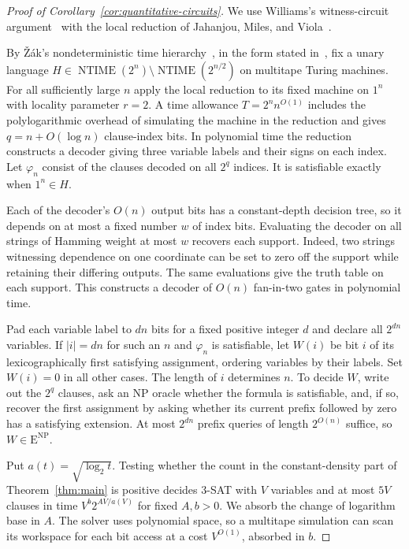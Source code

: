 \begin{proof}[Proof of Corollary~\ref{cor:quantitative-circuits}]
We use Williams's witness-circuit argument~\cite[Theorem~6.1]{Wil13}
with the local reduction of Jahanjou, Miles, and
Viola~\cite[Theorem~1 and Section~6]{JMV13}.

By \v{Z}\'ak's nondeterministic time hierarchy~\cite{Zak83}, in the
form stated in~\cite[Theorem~2.1 in the full version]{Wil13}, fix a unary language
$H\in\operatorname{NTIME}(2^n)\setminus\operatorname{NTIME}(2^{n/2})$
on multitape Turing machines. For all sufficiently large $n$ apply
the local reduction to its fixed machine on $1^n$ with locality parameter $r=2$. A time allowance
$T=2^n n^{O(1)}$ includes the polylogarithmic overhead of simulating
the machine in the reduction and gives $q=n+O(\log n)$ clause-index
bits. In polynomial time the reduction constructs a decoder giving
three variable labels and their signs on each index. Let $\varphi_n$
consist of the clauses decoded on all $2^q$ indices. It is satisfiable
exactly when $1^n\in H$.

Each of the decoder's $O(n)$ output bits has a constant-depth decision
tree, so it depends on at most a fixed number $w$ of index bits.
Evaluating the decoder on all strings of Hamming weight at most $w$
recovers each support. Indeed, two strings witnessing dependence on
one coordinate can be set to zero off the support while retaining
their differing outputs. The same evaluations give the truth table
on each support. This constructs a decoder of $O(n)$ fan-in-two gates
in polynomial time.

Pad each variable label to $dn$ bits for a fixed positive integer $d$
and declare all $2^{dn}$ variables. If $|i|=dn$ for such an $n$ and
$\varphi_n$ is satisfiable, let $W(i)$ be bit $i$ of its
lexicographically first satisfying assignment, ordering variables by
their labels. Set $W(i)=0$ in all other cases. The length of $i$
determines $n$. To decide $W$, write out the $2^q$ clauses, ask
an NP oracle whether the formula is satisfiable, and, if so,
recover the first assignment by asking whether its current prefix
followed by zero has a satisfying extension. At most $2^{dn}$ prefix
queries of length $2^{O(n)}$ suffice, so $W\in\mathrm E^{\mathrm{NP}}$.

Put $a(t)=\sqrt{\log_2 t}$. Testing whether the count in the
constant-density part of Theorem~\ref{thm:main} is positive
decides $3$-SAT with $V$ variables and at most $5V$ clauses in time
$V^b2^{A V/a(V)}$ for fixed $A,b>0$. We absorb the change of
logarithm base in $A$. The solver uses polynomial space, so a
multitape simulation can scan its workspace for each bit access at
a cost $V^{O(1)}$, absorbed in $b$.


\end{proof}
